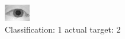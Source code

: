\begin{figure}[h!]
\begin{center}
\includegraphics[width=0.60\columnwidth]{figures/ID1009_class_1_target_2.png}
\end{center}
\caption{ Classification: 1 actual target: 2}
\label{fig:ID1009_class_1_target_2}
\end{figure}
